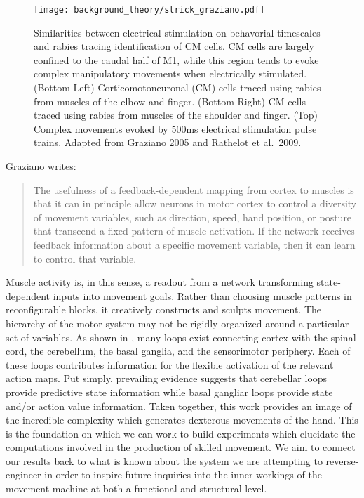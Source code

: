 \documentclass[../main.tex]{subfiles}
\begin{document}
\begin{figure}[!htb]
  \centering
  \texttt{[image: background\_theory/strick\_graziano.pdf]}
  \caption[Comparing the work of Strick and Graziano]{Similarities between electrical stimulation on behavorial timescales and rabies tracing identification of CM cells. CM cells are largely confined to the caudal half of M1, while this region tends to evoke complex manipulatory movements when electrically stimulated. (Bottom Left) Corticomotoneuronal (CM) cells traced using rabies from muscles of the elbow and finger. (Bottom Right) CM cells traced using rabies from muscles of the shoulder and finger. (Top) Complex movements evoked by 500ms electrical stimulation pulse trains. Adapted from Graziano 2005 and Rathelot et al.~2009\cite{grazianoArmMovementsEvoked2005,Rathelot2009}.}\label{fig:strick_graziano}
\end{figure}

Graziano writes:
%
\begin{quote} 
  The usefulness of a feedback-dependent mapping from cortex to muscles is that it can in principle allow neurons in motor cortex to control a diversity of movement variables, such as direction, speed, hand position, or posture that transcend a fixed pattern of muscle activation. If the network receives feedback information about a specific movement variable, then it can learn to control that variable.
\end{quote}
%
Muscle activity is, in this sense, a readout from a network transforming state-dependent inputs into movement goals. Rather than choosing muscle patterns in reconfigurable blocks, it creatively constructs and sculpts movement. The hierarchy of the motor system may not be rigidly organized around a particular set of variables. As shown in , many loops exist connecting cortex with the spinal cord, the cerebellum, the basal ganglia, and the sensorimotor periphery. Each of these loops contributes information for the flexible activation of the relevant action maps. Put simply, prevailing evidence suggests that cerebellar loops provide predictive state information while basal gangliar loops provide state and/or action value information. Taken together, this work provides an image of the incredible complexity which generates dexterous movements of the hand. This is the foundation on which we can work to build experiments which elucidate the computations involved in the production of skilled movement. We aim to connect our results back to what is known about the system we are attempting to reverse-engineer in order to inspire future inquiries into the inner workings of the movement machine at both a functional and structural level.
\end{document}
